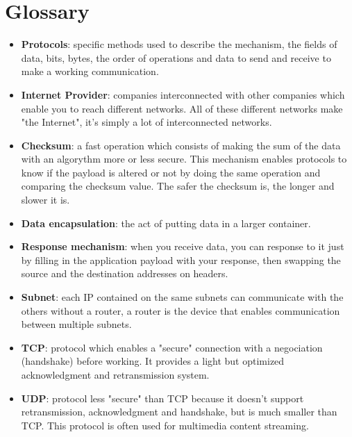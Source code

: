 \documentclass{article}
\begin{document}
	\newpage
	
\section{Glossary}
	
	\begin{itemize}
		\itemsep0em
		\item \textbf{Protocols}:
			specific methods used to describe the mechanism, the fields of data, bits, bytes,
			the order of operations and data to send and receive to make a working communication.
			
		\item \textbf{Internet Provider}: 
			companies interconnected with other companies which enable you to reach different networks.
			All of these different networks make "the Internet", it's simply a lot of interconnected networks.
			
		\item \textbf{Checksum}: 
			a fast operation which consists of making the sum of the data with an algorythm more or less secure.
			This mechanism enables protocols to know if the payload is altered or not by doing the same operation
			and comparing the checksum value. The safer the checksum is, the longer and slower it is.
			
		\item \textbf{Data encapsulation}: 
			the act of putting data in a larger container.
			
		\item \textbf{Response mechanism}: 
			when you receive data, you can response to it just by filling in the application payload
			with your response, then swapping the source and the destination addresses on headers.
			
		\item \textbf{Subnet}: 
			each IP contained on the same subnets can communicate with the others without a router, a router
			is the device that enables communication between multiple subnets.
			
		\item \textbf{TCP}: 
			protocol which enables a "secure" connection with a negociation (handshake) before working.
			It provides a light but optimized acknowledgment and retransmission system.
			
		\item \textbf{UDP}: 
			protocol less "secure" than TCP because it doesn't support retransmission, acknowledgment and handshake,
			but is much smaller than TCP. This protocol is often used for multimedia content streaming.
			

\end{itemize}
\end{document}
